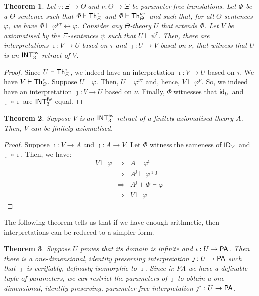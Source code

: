 \documentclass{amsart}
\renewcommand{\iff}{\leftrightarrow}
\renewcommand{\phi}{\varphi}
\renewcommand{\Theta}{\varTheta}
\renewcommand{\Phi}{\varPhi}
\renewcommand{\Xi}{\varXi}
\newcommand{\qedright}{\belowdisplayskip=-12pt}
\newtheorem{theorem}{Theorem}[section]
\newcommand{\To}{\Rightarrow}
\newcommand{\fol}[1]{{\sf Th}_{#1}}
\begin{document}
\begin{theorem}\label{supersmurf}
    Let $\tau:\Xi\to \Theta$ and $\nu:\Theta \to \Xi$ be parameter-free translations. Let $\Phi$ be a $\Theta$-sentence such that
    $\Phi \vdash \fol{\Xi}^\tau$ and $\Phi \vdash \fol{\Theta}^{\nu\tau}$ and such that, for all $\Theta$ sentences $\phi$,
    we have $\Phi \vdash \phi^{\nu\tau}\iff \phi$. Consider any $\Theta$-theory $U$ that extends $\Phi$. Let $V$ be axiomatised by
    the $\Xi$-sentences $\psi$ such that $U\vdash \psi^\tau$. Then, there are interpretations $\imath:V \to U$ based on $\tau$ and
    $\jmath:U \to V$ based on $\nu$, that witness that $U$ is an ${\sf INT}^{\sf fw}_3$-retract of $V$. 
\end{theorem}

\begin{proof}
    Since $U \vdash \fol {\Xi}^\tau$, we indeed have an interpretation $\imath:V \to U$ based on $\tau$. We have $V \vdash \fol {\Theta}^\nu$. Suppose
    $U \vdash \phi$. Then, $U \vdash \phi^{\nu\tau}$ and, hence, $V \vdash \phi^\nu$. So, we indeed have an interpretation $\jmath:V \to U$ based on $\nu$.
    Finally, $\Phi$ witnesses that ${\sf id}_U$ and $\jmath\circ \imath$ are ${\sf INT}^{\sf fw}_3$-equal.
\end{proof}

\begin{theorem}
    Suppose $V$ is an ${\sf INT}^{\sf fw}_3$-retract of a finitely axiomatised theory $A$. Then, $V$ can be finitely axiomatised.
\end{theorem}

\begin{proof}
Suppose $\imath:V\to A$ and $\jmath: A\to V$. Let $\Phi$ witness the sameness of ${\sf ID}_V$ and $\jmath\circ \imath$.
Then, we have:\qedright
\begin{eqnarray*}
    V \vdash \phi & \To & A\vdash \phi^\imath \\
    & \To & A^\jmath\vdash  \phi^{\imath\jmath} \\
    & \To & A^\jmath+\Phi \vdash \phi \\
    & \To & V \vdash \phi
\end{eqnarray*}
\end{proof}

The following theorem tells us that if we have enough arithmetic, then interpretations can be reduced to a simpler form.
\begin{theorem}\label{smulpaapsmurf}
    Suppose $U$ proves that its domain is infinite and
    $\imath: U \to {\sf PA}$. Then there is a one-dimensional, identity preserving interpretation
    $\jmath : U \to {\sf PA}$ such that $\jmath$ is verifiably, definably isomorphic to $\imath$.
    Since in {\sf PA} we have a definable tuple of parameters, we can restrict the parameters of $\jmath$ to obtain
    a one-dimensional, identity preserving, parameter-free interpretation $\jmath^\ast : U \to {\sf PA}$.
\end{theorem}
\end{document}
